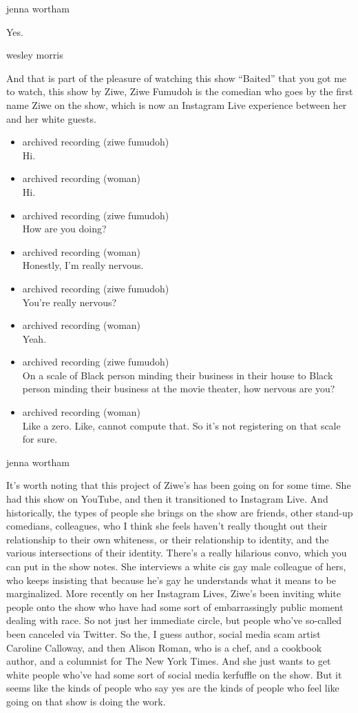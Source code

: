 jenna wortham

Yes.

wesley morris

And that is part of the pleasure of watching this show ``Baited'' that
you got me to watch, this show by Ziwe, Ziwe Fumudoh is the comedian who
goes by the first name Ziwe on the show, which is now an Instagram Live
experience between her and her white guests.

\begin{itemize}
\item
  archived recording (ziwe fumudoh)\\
  Hi.
\item
  archived recording (woman)\\
  Hi.
\item
  archived recording (ziwe fumudoh)\\
  How are you doing?
\item
  archived recording (woman)\\
  Honestly, I'm really nervous.
\item
  archived recording (ziwe fumudoh)\\
  You're really nervous?
\item
  archived recording (woman)\\
  Yeah.
\item
  archived recording (ziwe fumudoh)\\
  On a scale of Black person minding their business in their house to
  Black person minding their business at the movie theater, how nervous
  are you?
\item
  archived recording (woman)\\
  Like a zero. Like, cannot compute that. So it's not registering on
  that scale for sure.
\end{itemize}

jenna wortham

It's worth noting that this project of Ziwe's has been going on for some
time. She had this show on YouTube, and then it transitioned to
Instagram Live. And historically, the types of people she brings on the
show are friends, other stand-up comedians, colleagues, who I think she
feels haven't really thought out their relationship to their own
whiteness, or their relationship to identity, and the various
intersections of their identity. There's a really hilarious convo, which
you can put in the show notes. She interviews a white cis gay male
colleague of hers, who keeps insisting that because he's gay he
understands what it means to be marginalized. More recently on her
Instagram Lives, Ziwe's been inviting white people onto the show who
have had some sort of embarrassingly public moment dealing with race. So
not just her immediate circle, but people who've so-called been canceled
via Twitter. So the, I guess author, social media scam artist Caroline
Calloway, and then Alison Roman, who is a chef, and a cookbook author,
and a columnist for The New York Times. And she just wants to get white
people who've had some sort of social media kerfuffle on the show. But
it seems like the kinds of people who say yes are the kinds of people
who feel like going on that show is doing the work.


